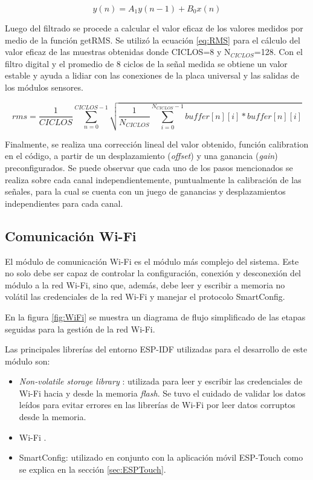 \begin{equation}
	\label{eq:filtro}
	y\left( n \right) = A_1 y\left( n-1 \right) + B_0 x\left( n \right)
\end{equation}

Luego del filtrado se procede a calcular el valor eficaz de los valores medidos por medio de la función getRMS. Se utilizó la ecuación \ref{eq:RMS} para el cálculo del valor eficaz de las muestras obtenidas donde CICLOS=8 y N$_{CICLOS}$=128. Con el filtro digital y el promedio de 8 ciclos de la señal medida se obtiene un valor estable y ayuda a lidiar con las conexiones de la placa universal y las salidas de los módulos sensores.

\begin{equation}
	\label{eq:RMS}
rms=\frac{1}{CICLOS}\sum_{n=0}^{CICLOS-1}\sqrt{\frac{1}{N_{CICLOS}}\sum_{i=0}^{ N_{CICLOS}-1} buffer\left [ n \right ]\left [ i \right ]*buffer\left [ n \right ]\left [ i \right ]}
\end{equation}

Finalmente, se realiza una corrección lineal del valor obtenido, función calibration en el código, a partir de un desplazamiento (\textit{offset}) y una ganancia (\textit{gain}) preconfigurados. Se puede observar que cada uno de los pasos mencionados se realiza sobre cada canal independientemente, puntualmente la calibración de las señales, para la cual se cuenta con un juego de ganancias y desplazamientos independientes para cada canal.

\subsection{Comunicación Wi-Fi}

El módulo de comunicación Wi-Fi es el módulo más complejo del sistema. Este no solo debe ser capaz de controlar la configuración, conexión y desconexión del módulo a la red Wi-Fi, sino que, además, debe leer y escribir a memoria no volátil las credenciales de la red Wi-Fi y manejar el protocolo SmartConfig. 

En la figura \ref{fig:WiFi} se muestra un diagrama de flujo simplificado de las etapas seguidas para la gestión de la red Wi-Fi. 

Las principales librerías del entorno ESP-IDF utilizadas para el desarrollo de este módulo son: 
\begin{itemize}
\item \textit{Non-volatile storage library} \citep{NVL}: utilizada para leer y escribir las credenciales de Wi-Fi hacia y desde la memoria \textit{flash}. Se tuvo el cuidado de validar los datos leídos para evitar errores en las librerías de Wi-Fi por leer datos corruptos desde la memoria.
\item Wi-Fi \citep{ESPIDF:WiFi}.
\item SmartConfig: utilizado en conjunto con la aplicación móvil ESP-Touch como se explica en la sección \ref{sec:ESPTouch}.
\end{itemize}

